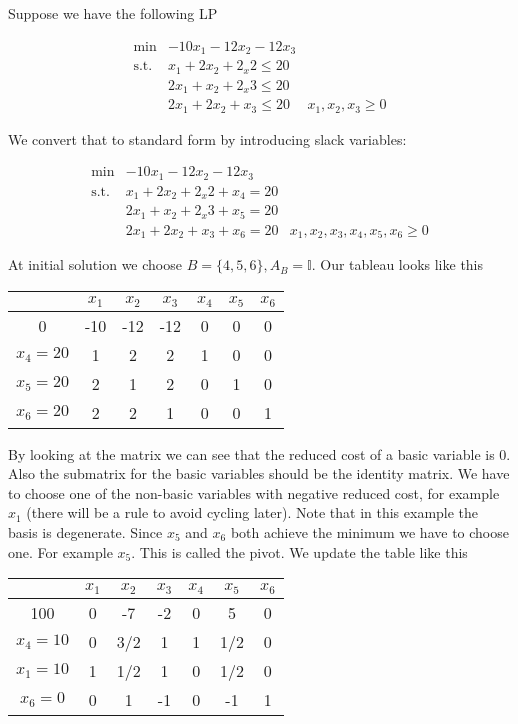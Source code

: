 \begin{Ex} Suppose we have the following LP

\begin{align*}
\min & -10x_1 -12x_2 -12x_3\\
\text{s.t.} & x_1+2x_2 +2_x2\leq 20\\
&2x_1 +x_2+2_x3\leq 20\\
& 2x_1+2x_2 +x_3\leq 20
& x_1,x_2,x_3 \geq 0
\end{align*}

We convert that to standard form by introducing slack variables:

\begin{align*}
\min & -10x_1 -12x_2 -12x_3\\
\text{s.t.} & x_1+2x_2 +2_x2 + x_4 = 20\\
&2x_1 +x_2+2_x3 +x_5 =20\\
& 2x_1+2x_2 +x_3 +x_6 = 20
& x_1,x_2,x_3,x_4,x_5,x_6 \geq 0
\end{align*}

At initial solution we choose $B=\{4,5,6\}, A_B=\mathbb{I}$. Our tableau looks like this

\begin{tabular}{c|cccccc}
  & $x_1$ & $x_2$ & $x_3$ & $x_4$ & $x_5$ & $x_6$ \\\hline
0 & -10 & -12 & -12 & 0 & 0 & 0\\
$x_4=20$ & 1 & 2 & 2 & 1 &  0 & 0 \\
$x_5=20$ & 2 & 1 & 2 & 0 &  1 & 0\\
$x_6=20$ & 2 & 2 & 1 & 0 &  0 & 1\\
\end{tabular}

By looking at the matrix we can see that the reduced cost of a basic variable is 0. Also the submatrix for the basic variables should be the identity matrix. We have to choose one of the non-basic variables with negative reduced cost, for example $x_1$ (there will be a rule to avoid cycling later). Note that in this example the basis is degenerate. Since $x_5$ and $x_6$ both achieve the minimum we have to choose one. For example $x_5$. This is called the pivot. We update the table like this

\begin{tabular}{c|cccccc}
  & $x_1$ & $x_2$ & $x_3$ & $x_4$ & $x_5$ & $x_6$ \\\hline
100 & 0 & -7 & -2 & 0 & 5 & 0\\
$x_4=10$ & 0 & 3/2 & 1 & 1 & 1/2 & 0 \\
$x_1=10$ & 1 & 1/2 & 1 & 0 &  1/2 & 0\\
$x_6=0$ & 0 & 1 & -1 & 0 & -1 &  1\\
\end{tabular}


\end{Ex}
